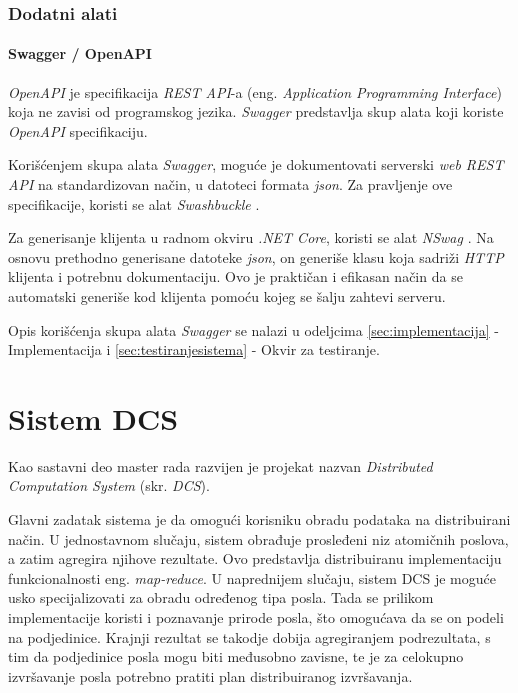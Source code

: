 \documentclass[12pt,oneside]{memoir}
\begin{document}
\subsection{Dodatni alati}
\label{sub:dodatnialati}

\subsubsection{Swagger / OpenAPI}

\emph{OpenAPI} \cite{OpenAPI} je specifikacija \emph{REST API}-a (eng. \emph{Application Programming Interface}) koja ne zavisi od programskog jezika. \emph{Swagger} \cite{Swagger} predstavlja skup alata koji koriste \emph{OpenAPI} specifikaciju.

Korišćenjem skupa alata \emph{Swagger}, moguće je dokumentovati serverski \emph{web REST API} na standardizovan način, u datoteci formata \emph{json}. Za pravljenje ove specifikacije, koristi se alat \emph{Swashbuckle} \cite{Swashbuckle}.

Za generisanje klijenta u radnom okviru \emph{.NET Core}, koristi se alat \emph{NSwag} \cite{NSwag}. Na osnovu prethodno generisane datoteke \emph{json}, on generiše klasu koja sadriži \emph{HTTP} klijenta i potrebnu dokumentaciju. Ovo je praktičan i efikasan način da se automatski generiše kod klijenta pomoću kojeg se šalju zahtevi serveru.

Opis korišćenja skupa alata \emph{Swagger} se nalazi u odeljcima \ref{sec:implementacija} - Implementacija i \ref{sec:testiranjesistema} - Okvir za testiranje.


\chapter{Sistem DCS}
\label{chp:sistemdcs}

Kao sastavni deo master rada razvijen je projekat nazvan \emph{Distributed Computation System} (skr. \emph{DCS}).

Glavni zadatak sistema je da omogući korisniku obradu podataka na distribuirani način.
U jednostavnom slučaju, sistem obrađuje prosleđeni niz atomičnih poslova, a zatim agregira njihove rezultate. Ovo predstavlja distribuiranu implementaciju funkcionalnosti eng. \emph{map-reduce}.
U naprednijem slučaju, sistem DCS je moguće usko specijalizovati za obradu određenog tipa posla. Tada se prilikom implementacije koristi i poznavanje prirode posla, što omogućava da se on podeli na podjedinice. Krajnji rezultat se takodje dobija agregiranjem podrezultata, s tim da podjedinice posla mogu biti međusobno zavisne, te je za celokupno izvršavanje posla potrebno pratiti plan distribuiranog izvršavanja.
\end{document}
